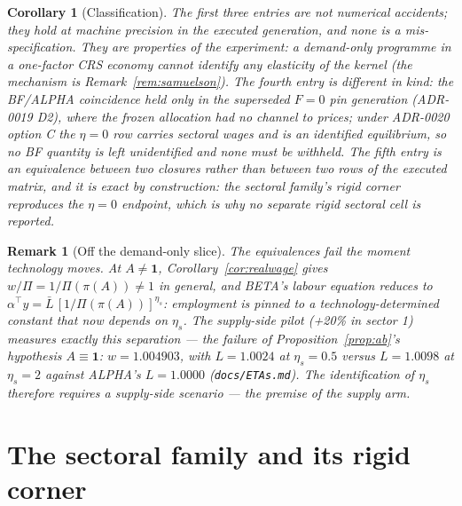 \documentclass[11pt]{article}
\newtheorem{corollary}{Corollary}
\newtheorem{remark}{Remark}
\numberwithin{equation}{section}
\newcommand{\Lbar}{\bar{L}}
\newcommand{\one}{\mathbf{1}}
\begin{document}
\begin{corollary}[Classification]
\textcolor{revisionV1}{The first three entries are not numerical
accidents; they hold at machine precision in the executed generation, and
none is a mis-specification. They are properties of the \emph{experiment}: a
demand-only programme in a one-factor CRS economy cannot identify any
elasticity of the kernel (the mechanism is Remark~\ref{rem:samuelson}). The
fourth entry is different in kind: the BF/ALPHA coincidence held only in the
superseded $F = 0$ pin generation (ADR-0019 D2), where the frozen allocation
had no channel to prices; under ADR-0020 option C the $\eta = 0$ row carries
sectoral wages and is an identified equilibrium, so no BF quantity is left
unidentified and none must be withheld.}
\textcolor{revisionV2}{The fifth entry is an equivalence between two
\emph{closures} rather than between two rows of the executed matrix, and it is
exact by construction: the sectoral family's rigid corner reproduces the
$\eta = 0$ endpoint, which is why no separate rigid sectoral cell is reported.}
\end{corollary}

\begin{remark}[Off the demand-only slice]\label{rem:supply}
The equivalences fail the moment technology moves. At $A \neq \one$,
Corollary~\ref{cor:realwage} gives $w/\Pi = 1/\Pi(\pi(A)) \neq 1$ in
general, and BETA's labour equation reduces to
$\alpha^{\!\top}y = \Lbar\,[1/\Pi(\pi(A))]^{\eta_s}$: employment is pinned
to a \emph{technology-determined constant} that now depends on $\eta_s$.
The supply-side pilot (+20\% in sector 1) measures exactly this separation
--- the failure of Proposition~\ref{prop:ab}'s hypothesis $A \equiv \one$:
$w = 1.004903$, with $L = 1.0024$ at $\eta_s = 0.5$ versus $L = 1.0098$ at
$\eta_s = 2$ against ALPHA's $L = 1.0000$ (\texttt{docs/ETAs.md}). The
identification of $\eta_s$ therefore requires a supply-side scenario ---
the premise of the supply arm.
\end{remark}

\section{The sectoral family and its rigid corner}\label{sec:sectoral}
\end{document}
